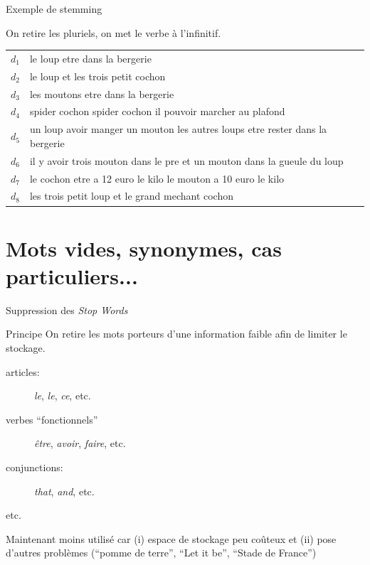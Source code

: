 \begin{frame}{Exemple de stemming}

On retire les pluriels, on met le verbe à l'infinitif.

\vfill

\begin{tabular}{>{\color{structure.fg}}ll}
     $d_1$&le loup etre dans la bergerie\\
     $d_2$&le loup et les trois petit cochon\\
     $d_3$&les moutons etre dans la bergerie\\
     $d_4$&spider cochon spider cochon il pouvoir marcher au plafond\\
     $d_5$&un loup avoir manger un mouton les autres loups etre rester dans la bergerie\\
     $d_6$&il y avoir trois mouton dans le pre et un mouton dans la gueule du loup\\
     $d_7$&le cochon etre a 12 euro le kilo le mouton a 10 euro le kilo\\
     $d_8$&les trois petit loup et le grand mechant cochon\\
\end{tabular}

\end{frame}


\section{Mots vides, synonymes, cas particuliers...}


\begin{frame}{Suppression des \textit{Stop Words}}

\begin{beamerboxesrounded}{Principe}
On retire les mots porteurs d'une information faible afin de limiter le stockage.
\end{beamerboxesrounded}

\begin{description}
\item[articles:] \emph{le}, \emph{le}, \emph{ce}, etc.

\item[verbes ``fonctionnels''] \emph{être}, \emph{avoir}, \emph{faire}, etc.

\item[conjunctions:] \emph{that}, \emph{and}, etc.

\item[etc.]
\end{description}

\begin{remark}
Maintenant moins utilisé car (i) espace de stockage peu coûteux et (ii) pose d'autres problèmes (``pomme de terre'',
``Let it be'', ``Stade de France'')
\end{remark}

\end{frame}



